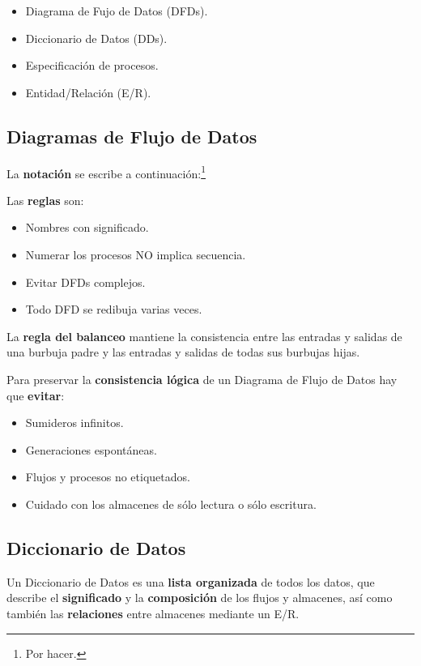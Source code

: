 \begin{itemize}[noitemsep]
\item Diagrama de Fujo de Datos (DFDs).
\item Diccionario de Datos (DDs).
\item Especificación de procesos.
\item Entidad/Relación (E/R).
\end{itemize}

\subsection{Diagramas de Flujo de Datos} %
La \textbf{notación} se escribe a continuación:\footnote{Por hacer.}


Las \textbf{reglas} son:

\begin{itemize}[noitemsep]
\item Nombres con significado.
\item Numerar los procesos NO implica secuencia.
\item Evitar DFDs complejos.
\item Todo DFD se redibuja varias veces.
\end{itemize}

La \textbf{regla del balanceo} mantiene la consistencia entre las entradas y salidas de una burbuja padre y las entradas y salidas de todas sus burbujas hijas.

Para preservar la \textbf{consistencia lógica} de un Diagrama de Flujo de Datos hay que \textbf{evitar}:

\begin{itemize}[noitemsep]
\item Sumideros infinitos.
\item Generaciones espontáneas.
\item Flujos y procesos no etiquetados.
\item Cuidado con los almacenes de sólo lectura o sólo escritura.
\end{itemize}


\subsection{Diccionario de Datos} %
Un Diccionario de Datos es una \textbf{lista organizada} de todos los datos, que describe el \textbf{significado} y la \textbf{composición} de los flujos y almacenes, así como también las \textbf{relaciones} entre almacenes mediante un E/R.

